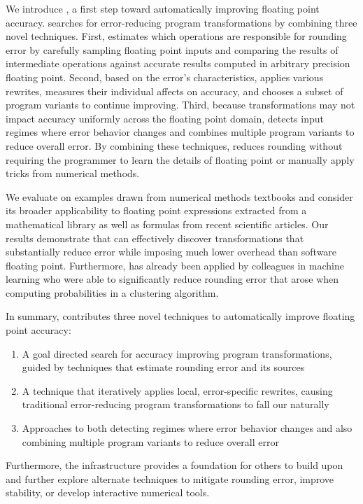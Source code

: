 \documentclass[paper.tex]{subfiles}
\begin{document}
We introduce \casio, a first step toward automatically improving
floating point accuracy.  \casio searches for error-reducing program
transformations by combining three novel techniques.  First, \casio
estimates which operations are responsible for rounding error by
carefully sampling floating point inputs and comparing the results of
intermediate operations against accurate results computed in arbitrary
precision floating point.  Second, based on the error's
characteristics, \casio applies various rewrites, measures their
individual affects on accuracy, and chooses a subset of program
variants to continue improving.  Third, because transformations may
not impact accuracy uniformly across the floating point domain, \casio
detects input regimes where error behavior changes and combines
multiple program variants to reduce overall error.  By combining these
techniques, \casio reduces rounding without requiring the programmer
to learn the details of floating point or manually apply tricks from
numerical methods.

We evaluate \casio on examples drawn from numerical methods textbooks
and consider its broader applicability to floating point expressions
extracted from a mathematical library as well as formulas from recent
scientific articles.  Our results demonstrate that \casio can
effectively discover transformations that substantially reduce error
while imposing much lower overhead than software floating point.
Furthermore, \casio has already been applied by colleagues in machine
learning who were able to significantly reduce rounding error that
arose when computing probabilities in a clustering algorithm.

In summary, \casio contributes three novel techniques to automatically
improve floating point accuracy:
\begin{enumerate}
\item A goal directed search for accuracy improving program
  transformations, guided by techniques that estimate rounding error
  and its sources
\item A technique that iteratively applies local, error-specific
  rewrites, causing traditional error-reducing program transformations
  to fall our naturally
\item Approaches to both detecting regimes where error behavior
  changes and also combining multiple program variants to reduce
  overall error
\end{enumerate}
Furthermore, the \casio infrastructure provides a foundation for
others to build upon and further explore alternate techniques to
mitigate rounding error, improve stability, or develop interactive
numerical tools.
\end{document}
